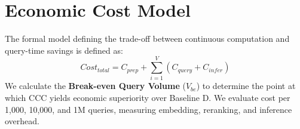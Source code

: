\section{Economic Cost Model}
\label{sec:cost}

The formal model defining the trade-off between continuous computation and query-time savings is defined as:
\begin{equation}
Cost_{total} = C_{prep} + \sum_{i=1}^{V} (C_{query} + C_{infer})
\end{equation}
We calculate the \textbf{Break-even Query Volume} ($V_{be}$) to determine the point at which CCC yields economic superiority over Baseline D. We evaluate cost per 1,000, 10,000, and 1M queries, measuring embedding, reranking, and inference overhead.
